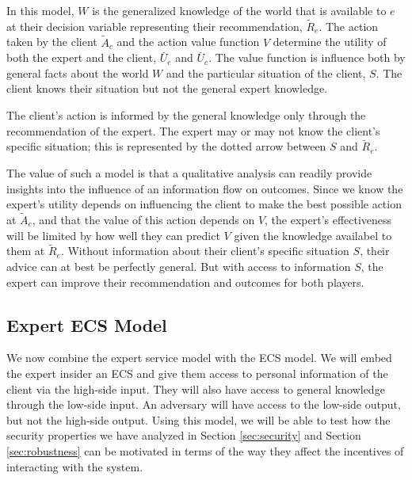 \documentclass[../thesis.tex]{subfiles}
\begin{document}
In this model, $W$ is the generalized knowledge of the world that
is available to $e$ at their decision variable representing
their recommendation, $\tilde{R}_e$.
The action taken by the client $\tilde{A}_c$ and the
action value function $V$ determine the utility of
both the expert and the client, $\breve{U_e}$ and $\breve{U_c}$.
The value function is influence both by general facts about
the world $W$ and the particular situation of the client, $S$.
The client knows their situation but not the general expert knowledge.

The client's action is informed by the general knowledge only
through the recommendation of the expert.
The expert may or may not know the client's specific situation;
this is represented by the dotted arrow between $S$ and $\tilde{R}_e$.

The value of such a model is that a qualitative analysis
can readily provide insights into the influence of an
information flow on outcomes.
Since we know the expert's utility depends on influencing
the client to make the best possible action at $\tilde{A}_c$,
and that the value of this action depends on $V$,
the expert's effectiveness will be limited by how well
they can predict $V$ given the knowledge availabel to them
at $\tilde{R}_e$.
Without information about their client's specific situation $S$,
their advice can at best be perfectly general.
But with access to information $S$, the expert can improve
their recommendation and outcomes for both players.

\subsection{Expert ECS Model}
\label{sec:expert-ecs-model}

We now combine the expert service model with
the ECS model.
We will embed the expert insider an ECS and give them
access to personal information of the client via the
high-side input.
They will also have access to general knowledge
through the low-side input.
An adversary will have access to the low-side output,
but not the high-side output.
Using this model, we will be able to test how
the security properties we have analyzed in
Section \ref{sec:security}
and Section \ref{sec:robustness} can
be motivated in terms of the way they
affect the incentives of interacting with the
system.
\end{document}
